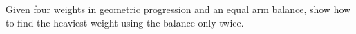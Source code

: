 Given four weights in geometric progression and an equal arm balance, show how to find the heaviest weight using the balance only twice.